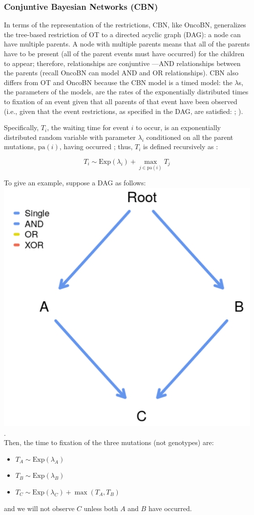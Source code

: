 \documentclass[a4paper,11pt]{article}
\begin{document}
\subsubsection{Conjuntive Bayesian Networks (CBN)}\label{cbndetails}

In terms of the representation of the restrictions, CBN, like OncoBN, generalizes the tree-based restriction of OT to a directed acyclic graph (DAG): a node can have multiple parents. A node with multiple parents means that all of the parents have to be present (all of the parent events must have occurred) for the children to appear; therefore, relationships are conjuntive ---AND relationships between the parents (recall OncoBN can model AND and OR relationships). CBN also differs from OT and OncoBN because the CBN model is a timed model: the $\lambda$s, the parameters of the models, are the rates of the exponentially distributed times to fixation of an  event given that all parents of that event have been observed (i.e., given that the event restrictions, as specified in the DAG, are satisfied: \citealp[p. i729]{montazeri2016large}; \citealp[section 2.2]{gerstung2009quantifying}).


Specifically, $T_i$, the waiting time for event $i$ to occur, is an exponentially distributed random variable with parameter $\lambda_i$ conditioned on all the parent mutations, $\mathrm{pa}(i)$, having occurred \citep{gerstung2009quantifying}; thus, $T_i$ is defined recursively as \citep{gerstung2009quantifying, hosseini2019a}:

\begin{equation}
  T_i \sim \mathrm{Exp}(\lambda_i) + \max_{j \in \mathrm{pa}(i)} T_j
\end{equation}


To give an example, suppose a DAG as follows: \\

\includegraphics[width=.40\linewidth]{./dag_cbn.png}.\\


Then, the time to fixation of the three mutations (not genotypes) are:
\begin{itemize}
\item $T_A \sim \mathrm{Exp}(\lambda_A)$
\item $T_B \sim \mathrm{Exp}(\lambda_B)$
\item $T_C \sim \mathrm{Exp}(\lambda_C) + \max (T_A, T_B)$
\end{itemize}
and we will not observe $C$ unless both $A$ and $B$ have occurred. 
\end{document}
